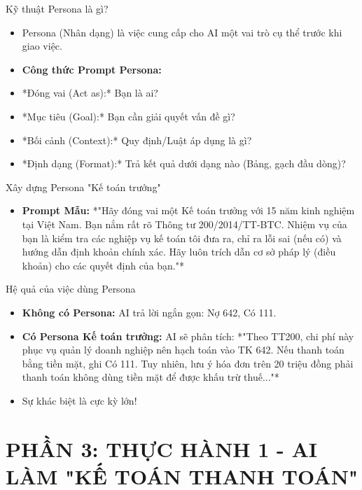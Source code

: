 \documentclass[aspectratio=169]{beamer}
\begin{document}
\begin{frame}{Kỹ thuật Persona là gì?}
    \begin{itemize}
        \item Persona (Nhân dạng) là việc cung cấp cho AI một vai trò cụ thể trước khi giao việc.
        \item \textbf{Công thức Prompt Persona:}
        \item *Đóng vai (Act as):* Bạn là ai?
        \item *Mục tiêu (Goal):* Bạn cần giải quyết vấn đề gì?
        \item *Bối cảnh (Context):* Quy định/Luật áp dụng là gì?
        \item *Định dạng (Format):* Trả kết quả dưới dạng nào (Bảng, gạch đầu dòng)?
    \end{itemize}
\end{frame}


\begin{frame}{Xây dựng Persona "Kế toán trưởng"}
    \begin{itemize}
        \item \textbf{Prompt Mẫu:} *"Hãy đóng vai một Kế toán trưởng với 15 năm kinh nghiệm tại Việt Nam. Bạn nắm rất rõ Thông tư 200/2014/TT-BTC. Nhiệm vụ của bạn là kiểm tra các nghiệp vụ kế toán tôi đưa ra, chỉ ra lỗi sai (nếu có) và hướng dẫn định khoản chính xác. Hãy luôn trích dẫn cơ sở pháp lý (điều khoản) cho các quyết định của bạn."*
    \end{itemize}
\end{frame}


\begin{frame}{Hệ quả của việc dùng Persona}
    \begin{itemize}
        \item \textbf{Không có Persona:} AI trả lời ngắn gọn: Nợ 642, Có 111.
        \item \textbf{Có Persona Kế toán trưởng:} AI sẽ phân tích: *"Theo TT200, chi phí này phục vụ quản lý doanh nghiệp nên hạch toán vào TK 642. Nếu thanh toán bằng tiền mặt, ghi Có 111. Tuy nhiên, lưu ý hóa đơn trên 20 triệu đồng phải thanh toán không dùng tiền mặt để được khấu trừ thuế..."*
        \item Sự khác biệt là cực kỳ lớn!
    \end{itemize}
\end{frame}


\section{PHẦN 3: THỰC HÀNH 1 - AI LÀM "KẾ TOÁN THANH TOÁN"}
\end{document}
